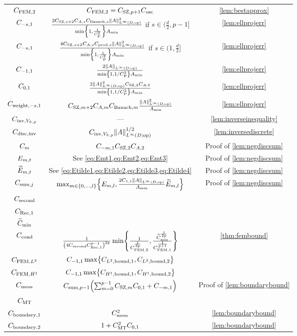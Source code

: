 \begin{longtabu}{ccc}
  $C_{\mathrm{FEM},2}$ & $C_{\mathrm{FEM},2} = C_{\mathrm{SZ},p+1}C_{\mathrm{osc}}$ & \cref{lem:bestapprox}\\
  $C_{-s,1}$ &$\frac{2\CSZfn{s+2}\CAfn{s}\CBanfn{s}\NLiDop{A}^2}{\min\set{1,\frac1{\CP^2}}\Amin}$ if $s \in (\frac{d}2,p-1]$& \cref{lem:ellprojerr} \\
  $C_{-s,1}$ &$\frac{4\CSZfn{s+2}\CAfn{s}\Cprod{s}\NLiDop{A}^2}{\min\set{1,\frac1{\CP^2}}\Amin}$ if $s \in (1,\frac{d}2]$& \cref{lem:ellprojerr} \\
  $C_{-1,1}$ &$\frac{2\NLiDop{A}}{\min\set{1,1/\CP^2}\Amin}$& \cref{lem:ellprojerr} \\
  $C_{0,1}$ &$\frac{2\NLiDop{A}^2\CSZfn{2}\CAfn{0}}{\min\set{1,1/\CP^2}\Amin}$& \cref{lem:ellprojerr} \\
  $C_{\mathrm{weight},-s,1}$ &$\CSZfn{m+2}\CAfn{m}\CBanfn{m}\frac{\NLiDop{A}^2}{\Amin}$& \cref{lem:ellprojerr} \\
  $C_{\mathrm{inv},V_{h,p}}$ &---& \cref{lem:inverseinequality}\\
  $C_{\mathrm{disc},\mathrm{inv}}$ & $\CinvVhp \NLiDop{A}^{1/2}$ & \cref{lem:inversediscrete}\\
  $C_{m}$ & $C_{-m,1} C_{\mathrm{SZ},2} C_{A,2}$ & Proof of \cref{lem:negdiscsum}\\
  $E_{m,t}$ & See \cref{eq:Emt1,eq:Emt2,eq:Emt3} & Proof of \cref{lem:negdiscsum}\\
  $\widetilde{E}_{m,t}$ & See \cref{eq:Etilde1,eq:Etilde2,eq:Etilde3,eq:Etilde4} & Proof of \cref{lem:negdiscsum}\\
  $C_{\mathrm{sum},j}$ &$\max_{m \in \set{0,\ldots,l}}\set{\Efn{m,l},\frac{2\Cfn{1,1}\NLiDop{A}}{\Amin}\Etildefn{m,l}}$ & Proof of \cref{lem:negdiscsum}\\
  $C_{\mathrm{second}}$ &&\\
  $C_{\mathrm{Rec},1}$&&\\
  $\widetilde{C}_{\min}$&&\\
  $C_{\mathrm{cond}}$ & $\frac1{\mleft(4\Csecond \CReco^{p-1}\mright)^{2p}} \min\set{\frac1{\CFEMttilde^{\frac1{2p}}},\frac{\Ctildemin^{\frac1{2p}}}{\CFEMotilde^{\frac1{p+1}}}}$ & \cref{thm:fembound}\\
  $C_{\mathrm{FEM},L^{2}}$ &$\Cfn{-1,1} \max\set{\CLtboundo,\CLtboundt}$&\\
  $C_{\mathrm{FEM},H^{1}}$ &$\Cfn{-1,1}\max\set{\CHoboundo,\CHoboundt}$&\\
  $C_{\mathrm{mess}}$ &$\Csumpmo \mleft(\sum_{m=0}^{p-1} \CSZfn{m} \Cfn{0,1} + \Cfn{-m,1}\mright)$&Proof of \cref{lem:boundarybound}\\
  $C_{\mathrm{MT}}$ &&\\
  $C_{\mathrm{boundary},1}$ & $C_{\mathrm{mess}}^2$ & \cref{lem:boundarybound} \\
  $C_{\mathrm{boundary},2}$ & $1 + C_{\mathrm{MT}}^2 C_{0,1}$ & \cref{lem:boundarybound}\\

\end{longtabu}
